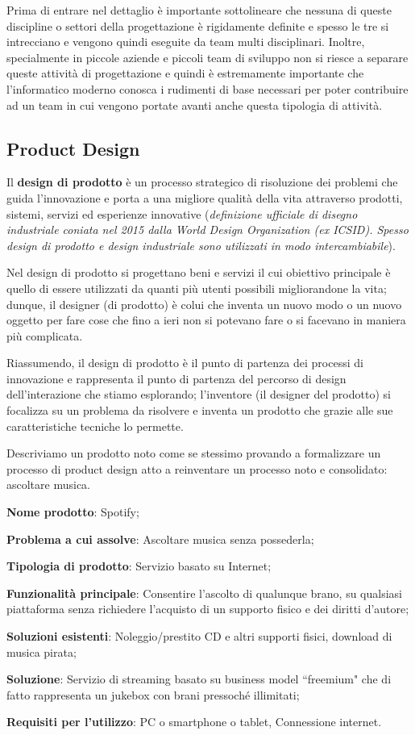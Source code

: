 Prima di entrare nel dettaglio è importante sottolineare che nessuna di queste discipline o settori della progettazione è rigidamente definite e spesso
le tre si intrecciano e vengono quindi eseguite da team multi disciplinari. Inoltre, specialmente in piccole aziende e piccoli team di sviluppo non
si riesce a separare queste attività di progettazione e quindi è estremamente importante che l'informatico moderno conosca i rudimenti di base
necessari per poter contribuire ad un team in cui vengono portate avanti anche questa tipologia di attività.


\subsection{Product Design}
Il \textbf{design di prodotto} è un processo strategico di risoluzione dei problemi che guida l'innovazione e porta a una migliore qualità della vita
attraverso prodotti, sistemi, servizi ed esperienze innovative (\textit{definizione ufficiale di disegno industriale coniata nel 2015 dalla World
Design Organization (ex ICSID). Spesso design di prodotto e design industriale sono utilizzati in modo intercambiabile}). 

Nel design di prodotto si progettano beni e servizi il cui obiettivo principale è quello di essere utilizzati da quanti più utenti possibili
migliorandone la vita; dunque, il designer (di prodotto) è colui che inventa un nuovo modo o un nuovo oggetto per fare cose che fino a ieri non si potevano
fare o si facevano in maniera più complicata.

Riassumendo, il design di prodotto è il punto di partenza dei processi di innovazione e rappresenta il punto di partenza del percorso di design
dell'interazione che stiamo esplorando; l'inventore (il designer del prodotto) si focalizza su un problema da risolvere e inventa un prodotto che
grazie alle sue caratteristiche tecniche lo permette.

Descriviamo un prodotto noto come se stessimo provando a formalizzare un processo di product design atto a reinventare un processo noto e consolidato:
ascoltare musica.

\begin{flushleft}
\textbf{Nome prodotto}: Spotify;

\textbf{Problema a cui assolve}: Ascoltare musica senza possederla;

\textbf{Tipologia di prodotto}: Servizio basato su Internet;

\textbf{Funzionalità principale}: Consentire l'ascolto di qualunque brano, su qualsiasi piattaforma senza richiedere l'acquisto di un supporto fisico
e dei diritti d'autore;

\textbf{Soluzioni esistenti}: Noleggio/prestito CD e altri supporti fisici, download di musica pirata;

\textbf{Soluzione}: Servizio di streaming basato su business model ``freemium" che di fatto rappresenta un jukebox con brani pressoché illimitati;

\textbf{Requisiti per l'utilizzo}: PC o smartphone o tablet, Connessione internet. 
\end{flushleft}

